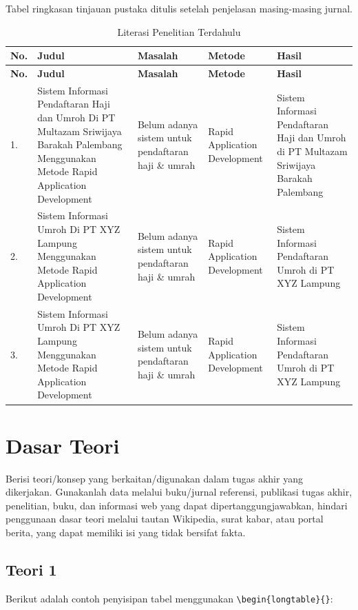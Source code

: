 Tabel ringkasan tinjauan pustaka ditulis setelah penjelasan masing-masing jurnal. \par
\begin{longtable}{| b{}|p{}|p{}|p{}|p{}|} %
	\caption{Literasi Penelitian Terdahulu}
	\label{table:2.literasi}\\
	\hline
	\textbf{No.} & \textbf{Judul} & \textbf{Masalah} & \textbf{Metode} & \textbf{Hasil} \\
	\hline
	\endfirsthead %
	\hline
	\textbf{No.} & \textbf{Judul} & \textbf{Masalah} & \textbf{Metode} & \textbf{Hasil} \\
	\hline
	\endhead %
	1. & Sistem Informasi Pendaftaran Haji dan Umroh Di PT Multazam Sriwijaya Barakah Palembang Menggunakan Metode Rapid Application Development & Belum adanya sistem untuk pendaftaran haji \& umrah & Rapid Application Development & Sistem Informasi Pendaftaran Haji dan Umroh di PT Multazam Sriwijaya Barakah Palembang\\ 
	\hline
	2. & Sistem Informasi Umroh Di PT XYZ Lampung Menggunakan Metode Rapid Application Development & Belum adanya sistem untuk pendaftaran haji \& umrah & Rapid Application Development & Sistem Informasi Pendaftaran Umroh di PT XYZ Lampung\\ 
	\hline
	3. & Sistem Informasi Umroh Di PT XYZ Lampung Menggunakan Metode Rapid Application Development & Belum adanya sistem untuk pendaftaran haji \& umrah & Rapid Application Development & Sistem Informasi Pendaftaran Umroh di PT XYZ Lampung\\ 
	\hline
\end{longtable}

\section{Dasar Teori} \label{II.Teori}
Berisi teori/konsep yang berkaitan/digunakan dalam tugas akhir yang dikerjakan. Gunakanlah data melalui buku/jurnal referensi, publikasi tugas akhir, penelitian, buku, dan informasi web yang dapat dipertanggungjawabkan, hindari penggunaan dasar teori melalui tautan Wikipedia, surat kabar, atau portal berita, yang dapat memiliki isi yang tidak bersifat fakta. \par

\subsection{Teori 1} \label{II.Teori1}
Berikut adalah contoh penyisipan tabel menggunakan \verb|\begin{longtable}{}|: \par
	
